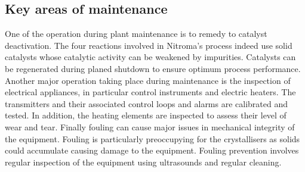 \subsection{Key areas of maintenance} %

One of the operation during plant maintenance is to remedy to catalyst deactivation. The four reactions involved in Nitroma's process indeed use solid catalysts whose catalytic activity can be weakened by impurities. Catalysts can be regenerated during planed shutdown to ensure optimum process performance. Another major operation taking place during maintenance is the inspection of electrical appliances, in particular control instruments and electric heaters. The transmitters and their associated control loops and alarms are calibrated and tested. In addition, the heating elements are inspected to assess their level of wear and tear. Finally fouling can cause major issues in mechanical integrity of the equipment. Fouling is particularly preoccupying for the crystallisers as solids could accumulate causing damage to the equipment. Fouling prevention involves regular inspection of the equipment using ultrasounds and regular cleaning.